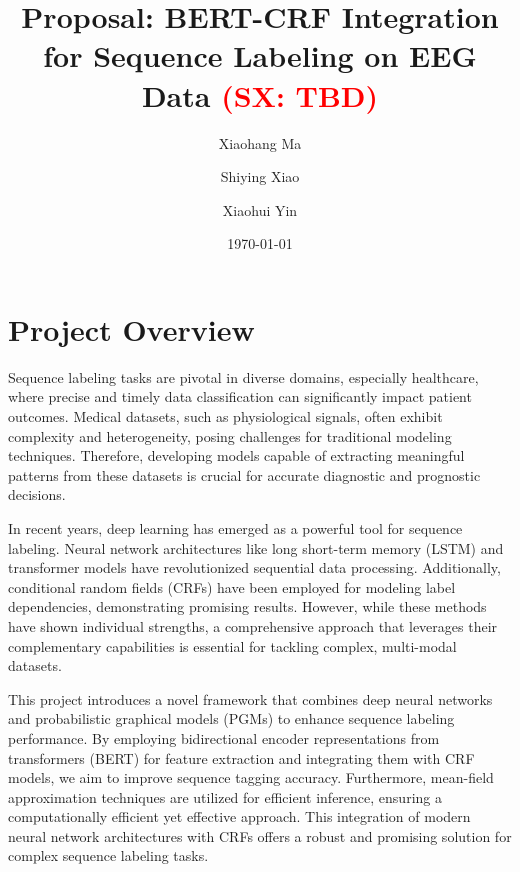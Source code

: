 \documentclass[12pt]{article}
\newcommand{\sx}[1]{\textcolor{red}{(SX: #1)}}
\begin{document}
\title{Proposal:
BERT-CRF Integration for Sequence Labeling on EEG Data \sx{TBD}}

\author[1]{Xiaohang Ma}
\author[2]{Shiying Xiao}
\author[2]{Xiaohui Yin}


\date{\today}

\maketitle


\section{Project Overview}


Sequence labeling tasks are pivotal in diverse domains, especially healthcare,
where precise and timely data classification can significantly impact patient
outcomes. Medical datasets, such as physiological signals, often exhibit
complexity and heterogeneity, posing challenges for traditional modeling
techniques. Therefore, developing models capable of extracting meaningful
patterns from these datasets is crucial for accurate diagnostic and prognostic
decisions.


In recent years, deep learning has emerged as a powerful tool for sequence
labeling. Neural network architectures like long short-term memory (LSTM) and
transformer models have revolutionized sequential data processing.
Additionally, conditional random fields (CRFs) have been employed for modeling
label dependencies, demonstrating promising results.
However, while these methods have shown individual strengths, a comprehensive
approach that leverages their complementary capabilities is essential for
tackling complex, multi-modal datasets.


This project introduces a novel framework that combines deep neural networks
and probabilistic graphical models (PGMs) to enhance sequence labeling
performance. By employing bidirectional encoder representations from
transformers (BERT) for feature extraction and integrating them with CRF models,
we aim to improve sequence tagging accuracy. Furthermore, mean-field
approximation techniques are utilized for efficient inference, ensuring a
computationally efficient yet effective approach.
This integration of modern neural network architectures with CRFs offers
a robust and promising solution for complex sequence labeling tasks.
\end{document}
